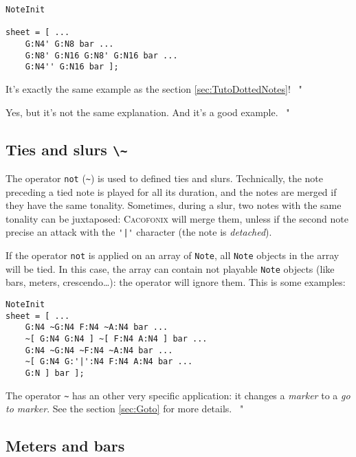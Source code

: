 \documentclass{article}
\newcommand\cacofonix{\textsc{Cacofonix}\xspace}
\newcommand\note{\lstinline!Note!\xspace}
\newenvironment{meenv}{ \par \noindent \makebox[6em][r]{ \textcolor{mecolor}{Me}: " --~}}{~"}
\newenvironment{myselfenv}{ \par \noindent \makebox[6em][r]{ \textcolor{myselfcolor}{Myself}: " --~}}{~"}
\newcommand{ \me }[1]{%
\begin{meenv}%
	#1%
\end{meenv} }
\newcommand{ \myself }[1]{%
\begin{myselfenv}%
	#1%
\end{myselfenv} }
\begin{document}
\begin{lstlisting}
NoteInit

sheet = [ ...
	G:N4' G:N8 bar ...
	G:N8' G:N16 G:N8' G:N16 bar ...
	G:N4'' G:N16 bar ];
\end{lstlisting}

\me{It's exactly the same example as the section \ref{sec:TutoDottedNotes}!}
\myself{Yes, but it's not the same explanation. And it's a good example.}

\subsection{Ties and slurs \lstinline!\~!}
\label{sec:TiesAndSlurs}

The operator \lstinline!not! (\lstinline!~!) is used to defined ties and slurs. Technically, the note preceding a tied note is played for all its duration, and the notes are merged if they have the same tonality. Sometimes, during a slur, two notes with the same tonality can be juxtaposed: \cacofonix will merge them, unless if the second note precise an attack with the \lstinline!'|'! character (the note is \emph{detached}).

If the operator \lstinline!not! is applied on an array of \note, all \note objects in the array will be tied. In this case, the array can contain not playable \note objects (like bars, meters, crescendo\dots): the operator will ignore them. This is some examples: \\

\begin{lstlisting}
NoteInit
sheet = [ ...
	G:N4 ~G:N4 F:N4 ~A:N4 bar ...
	~[ G:N4 G:N4 ] ~[ F:N4 A:N4 ] bar ...
	G:N4 ~G:N4 ~F:N4 ~A:N4 bar ...
	~[ G:N4 G:'|':N4 F:N4 A:N4 bar ...
	G:N ] bar ];
\end{lstlisting}

\begin{meenv}%
The operator \lstinline!~! has an other very specific application: it changes a \emph{marker} to a \emph{go to marker}. See the section \ref{sec:Goto} for more details.%
\end{meenv}

\subsection{Meters and bars}
\label{sec:MetersAndBars}
\end{document}
